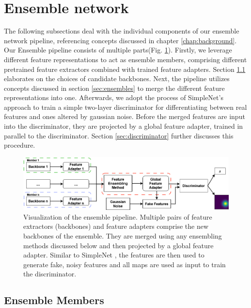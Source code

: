\section{Ensemble network}
\label{sec:ourensemblenetwork}


The following subsections deal with the individual components of our ensemble network pipeline, referencing concepts discussed in chapter \ref{chap:background}. Our Ensemble pipeline 
consists of multiple parts(Fig. \ref{fig:ensemblepipeline}). Firstly, we leverage different feature representations to act as ensemble members, comprising 
different pretrained feature extractors combined with trained feature adapters. Section \ref{sec:ensemblecandidates} elaborates on the choices of candidate backbones. Next, the pipeline 
utilizes concepts discussed in section \ref{sec:ensembles} to merge the different feature representations into one. Afterwards, we adopt the process of SimpleNet's \cite{liu2023simplenet} 
approach to train a simple two-layer discriminator for differentiating between real features and ones altered by gaussian noise. Before the merged features are input into the 
discriminator, they are projected by a global feature adapter, trained in parallel to the discriminator. Section \ref{sec:discriminator} further discusses this procedure.

\begin{figure}[htbp]
    \centering
    \includegraphics[width=\textwidth]{figures/ensemblepipeline.png}
    \caption{Visualization of the ensemble pipeline. Multiple pairs of feature extractors (backbones) and feature adapters comprise the new backbones of the ensemble. They are 
            merged using any ensembling methods discussed below and then projected by a global feature adapter. Similar to SimpleNet \cite{liu2023simplenet}, the 
            features are then used to generate fake, noisy features and all maps are used as input to train the discriminator.}
    \label{fig:ensemblepipeline}
\end{figure}


\subsection{Ensemble Members}
\label{sec:ensemblecandidates}

